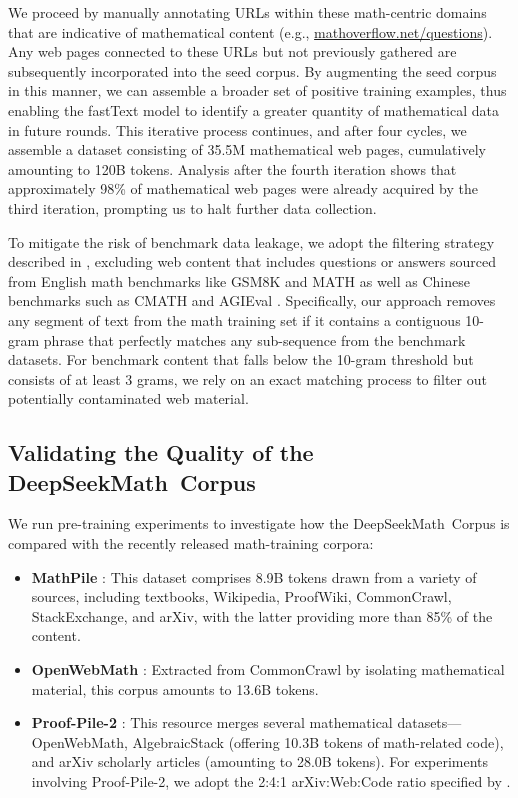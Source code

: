 \begin{itemize}[topsep=0pt]
We proceed by manually annotating URLs within these math-centric domains that are indicative of mathematical content (e.g., \url{mathoverflow.net/questions}). Any web pages connected to these URLs but not previously gathered are subsequently incorporated into the seed corpus. By augmenting the seed corpus in this manner, we can assemble a broader set of positive training examples, thus enabling the fastText model to identify a greater quantity of mathematical data in future rounds. This iterative process continues, and after four cycles, we assemble a dataset consisting of 35.5M mathematical web pages, cumulatively amounting to 120B tokens. Analysis after the fourth iteration shows that approximately 98\% of mathematical web pages were already acquired by the third iteration, prompting us to halt further data collection.

To mitigate the risk of benchmark data leakage, we adopt the filtering strategy described in \cite{deepseek-coder}, excluding web content that includes questions or answers sourced from English math benchmarks like GSM8K \citep{gsm8k} and MATH \citep{MATH} as well as Chinese benchmarks such as CMATH \citep{wei2023cmath} and AGIEval \citep{agieval}. Specifically, our approach removes any segment of text from the math training set if it contains a contiguous 10-gram phrase that perfectly matches any sub-sequence from the benchmark datasets. For benchmark content that falls below the 10-gram threshold but consists of at least 3 grams, we rely on an exact matching process to filter out potentially contaminated web material.

\subsection{Validating the Quality of the DeepSeekMath~Corpus}

We run pre-training experiments to investigate how the DeepSeekMath~Corpus is compared with the recently released math-training corpora:

\begin{itemize}[topsep=0pt]
    \item \textbf{MathPile} \citep{mathpile}: This dataset comprises 8.9B tokens drawn from a variety of sources, including textbooks, Wikipedia, ProofWiki, CommonCrawl, StackExchange, and arXiv, with the latter providing more than 85\% of the content.
    \item \textbf{OpenWebMath} \citep{openwebmath}: Extracted from CommonCrawl by isolating mathematical material, this corpus amounts to 13.6B tokens.
    \item \textbf{Proof-Pile-2} \citep{llemma}: This resource merges several mathematical datasets—OpenWebMath, AlgebraicStack (offering 10.3B tokens of math-related code), and arXiv scholarly articles (amounting to 28.0B tokens). For experiments involving Proof-Pile-2, we adopt the 2:4:1 arXiv:Web:Code ratio specified by \cite{llemma}.
\end{itemize}


\end{itemize}
